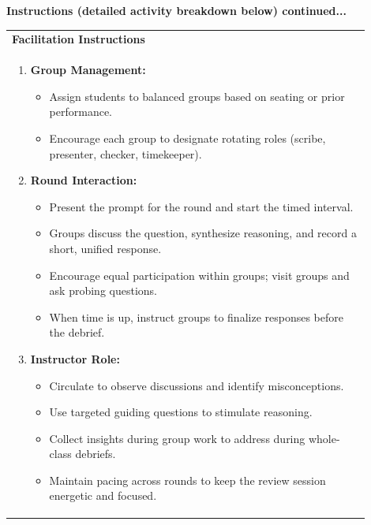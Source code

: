 \documentclass{article}
\begin{document}
\noindent
{\large \textbf{Instructions (detailed activity breakdown below) continued...}} \\
\vspace{0.5cm}
\noindent
\begin{tabular}{|p{0.9\linewidth}|}
\hline
{\large\textbf{Facilitation Instructions}} \\
\begin{enumerate}[label=\alph*.]
    \item \textbf{Group Management:} 
    \begin{itemize}
        \item Assign students to balanced groups based on seating or prior performance.
        \item Encourage each group to designate rotating roles (scribe, presenter, checker, timekeeper).
    \end{itemize}

    \item \textbf{Round Interaction:} 
    \begin{itemize}
        \item Present the prompt for the round and start the timed interval.
        \item Groups discuss the question, synthesize reasoning, and record a short, unified response.
        \item Encourage equal participation within groups; visit groups and ask probing questions.
        \item When time is up, instruct groups to finalize responses before the debrief.
    \end{itemize}

    \item \textbf{Instructor Role:}
    \begin{itemize}
        \item Circulate to observe discussions and identify misconceptions.
        \item Use targeted guiding questions to stimulate reasoning.
        \item Collect insights during group work to address during whole-class debriefs.
        \item Maintain pacing across rounds to keep the review session energetic and focused.
    \end{itemize}
\end{enumerate} \\
\hline
\end{tabular}
\end{document}
